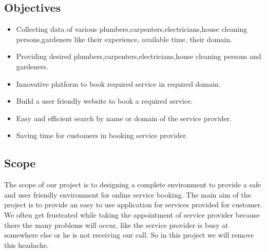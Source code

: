 \documentclass[12pt,a4paper]{report}
\begin{document}
\begin{titlepage}
{\subsection{Objectives}
\vspace{0.5cm}
\begin{itemize}
	\item Collecting data of various plumbers,carpenters,electricians,house cleaning persons,gardeners like their experience, available time, their domain.
	\item Providing desired plumbers,carpenters,electricians,house cleaning persons and gardeners.
	\item Innovative platform to book required service in required domain.
	\item Build a user friendly website to book a required service.
	\item Easy and efficient search by name or domain of the service provider.
	\item Saving time for customers in booking service provider.
\end{itemize}
\vspace{0.5cm}
\subsection{Scope}
\vspace{0.5cm}
The scope of our project is to designing a complete environment to provide a safe and user friendly environment for online service booking. The main aim of the project is to provide an easy to use application for services provided for customer.\\
We often get frustrated while taking the appointment of service provider because there the many problems will occur,  like the service provider is busy at somewhere else or  he is not receiving our call. So in this project we will remove this headache.\\
\newpage
}
\end{titlepage}
\end{document}
